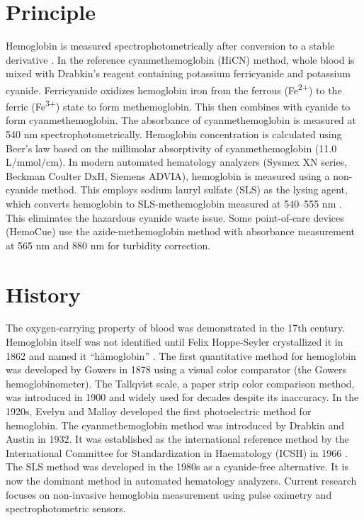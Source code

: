 \section*{Principle}
Hemoglobin is measured spectrophotometrically after conversion to a stable derivative \cite{tietz2023textbook}. In the reference cyanmethemoglobin (HiCN) method, whole blood is mixed with Drabkin's reagent containing potassium ferricyanide and potassium cyanide. Ferricyanide oxidizes hemoglobin iron from the ferrous (Fe\textsuperscript{2+}) to the ferric (Fe\textsuperscript{3+}) state to form methemoglobin. This then combines with cyanide to form cyanmethemoglobin. The absorbance of cyanmethemoglobin is measured at 540 nm spectrophotometrically. Hemoglobin concentration is calculated using Beer's law based on the millimolar absorptivity of cyanmethemoglobin (11.0 L/mmol/cm). In modern automated hematology analyzers (Sysmex XN series, Beckman Coulter DxH, Siemens ADVIA), hemoglobin is measured using a non-cyanide method. This employs sodium lauryl sulfate (SLS) as the lysing agent, which converts hemoglobin to SLS-methemoglobin measured at 540--555 nm \cite{bain2017dacie}. This eliminates the hazardous cyanide waste issue. Some point-of-care devices (HemoCue) use the azide-methemoglobin method with absorbance measurement at 565 nm and 880 nm for turbidity correction.

\section*{History}
The oxygen-carrying property of blood was demonstrated in the 17th century. Hemoglobin itself was not identified until Felix Hoppe-Seyler crystallized it in 1862 and named it ``h\"{a}moglobin'' \cite{schechter2008hemoglobin}. The first quantitative method for hemoglobin was developed by Gowers in 1878 using a visual color comparator (the Gowers hemoglobinometer). The Tallqvist scale, a paper strip color comparison method, was introduced in 1900 and widely used for decades despite its inaccuracy. In the 1920s, Evelyn and Malloy developed the first photoelectric method for hemoglobin. The cyanmethemoglobin method was introduced by Drabkin and Austin in 1932. It was established as the international reference method by the International Committee for Standardization in Haematology (ICSH) in 1966 \cite{kaushansky2021williams}. The SLS method was developed in the 1980s as a cyanide-free alternative. It is now the dominant method in automated hematology analyzers. Current research focuses on non-invasive hemoglobin measurement using pulse oximetry and spectrophotometric sensors.

